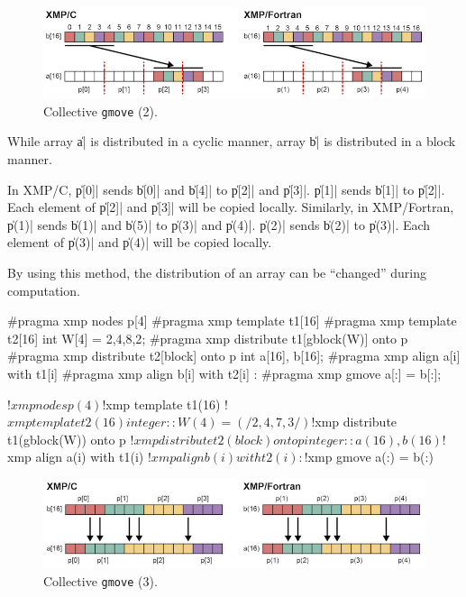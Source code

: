 \begin{figure}
  \centering
  \includegraphics[width=\textwidth]{figs/gmove_cyclic.png}
  \caption{Collective {\tt gmove} (2).}
\end{figure}

While array \|a| is distributed in a cyclic manner, array \|b| is
distributed in a block manner.

In XMP/C, \|p[0]| sends \|b[0]| and \|b[4]| to \|p[2]| and
\|p[3]|. \|p[1]| sends \|b[1]| to \|p[2]|. Each element of \|p[2]| and
\|p[3]| will be copied locally. Similarly, in XMP/Fortran, \|p(1)| sends
\|b(1)| and \|b(5)| to \|p(3)| and \|p(4)|. \|p(2)| sends \|b(2)| to
\|p(3)|. Each element of \|p(3)| and \|p(4)| will be copied locally.


By using this method, the distribution of an array can be ``changed''
during computation.

\begin{XCexample}
#pragma xmp nodes p[4]
#pragma xmp template t1[16]
#pragma xmp template t2[16]
int W[4] = {2,4,8,2};
#pragma xmp distribute t1[gblock(W)] onto p
#pragma xmp distribute t2[block] onto p
int a[16], b[16];
#pragma xmp align a[i] with t1[i]
#pragma xmp align b[i] with t2[i]
     :
#pragma xmp gmove
  a[:] = b[:];
\end{XCexample}

\begin{XFexample}
!$xmp nodes p(4)
!$xmp template t1(16)
!$xmp template t2(16)
integer :: W(4) = (/2,4,7,3/)
!$xmp distribute t1(gblock(W)) onto p
!$xmp distribute t2(block) onto p
integer :: a(16), b(16)
!$xmp align a(i) with t1(i)
!$xmp align b(i) with t2(i)
     :
!$xmp gmove
  a(:) = b(:)
\end{XFexample}

\begin{figure}
  \centering
  \includegraphics[width=\textwidth]{figs/gmove_change.png}
  \caption{Collective {\tt gmove} (3).}
\end{figure}

